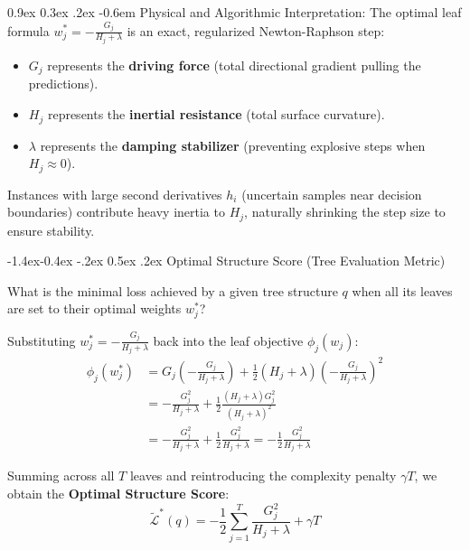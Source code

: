 \documentclass[11pt,a4paper]{article}
\makeatletter
\renewcommand\subsection{\@startsection{subsection}{2}{\z@}%
                                     {-1.4ex\@plus -0.4ex \@minus -.2ex}%
                                     {0.5ex \@plus .2ex}%
                                     {\normalfont\normalsize\bfseries}}
\renewcommand\paragraph{\@startsection{paragraph}{4}{\z@}%
                                     {0.9ex \@plus0.3ex \@minus.2ex}%
                                     {-0.6em}%
                                     {\normalfont\normalsize\bfseries}}
\makeatother
\begin{document}
\paragraph{Physical and Algorithmic Interpretation:}
The optimal leaf formula $w_j^* = -\frac{G_j}{H_j + \lambda}$ is an exact, regularized Newton-Raphson step:
\begin{itemize}
    \item $G_j$ represents the \textbf{driving force} (total directional gradient pulling the predictions).
    \item $H_j$ represents the \textbf{inertial resistance} (total surface curvature).
    \item $\lambda$ represents the \textbf{damping stabilizer} (preventing explosive steps when $H_j \approx 0$).
\end{itemize}
Instances with large second derivatives $h_i$ (uncertain samples near decision boundaries) contribute heavy inertia to $H_j$, naturally shrinking the step size to ensure stability.

\subsection{Optimal Structure Score (Tree Evaluation Metric)}

What is the minimal loss achieved by a given tree structure $q$ when all its leaves are set to their optimal weights $w_j^*$?

Substituting $w_j^* = -\frac{G_j}{H_j + \lambda}$ back into the leaf objective $\phi_j(w_j)$:
\begin{align}
    \phi_j(w_j^*) &= G_j \left( -\frac{G_j}{H_j + \lambda} \right) + \frac{1}{2}(H_j + \lambda) \left( -\frac{G_j}{H_j + \lambda} \right)^2 \nonumber \\
    &= -\frac{G_j^2}{H_j + \lambda} + \frac{1}{2} \frac{(H_j + \lambda) G_j^2}{(H_j + \lambda)^2} \nonumber \\
    &= -\frac{G_j^2}{H_j + \lambda} + \frac{1}{2} \frac{G_j^2}{H_j + \lambda} = -\frac{1}{2} \frac{G_j^2}{H_j + \lambda}
\end{align}

Summing across all $T$ leaves and reintroducing the complexity penalty $\gamma T$, we obtain the \textbf{Optimal Structure Score}:
\begin{equation}
    \tilde{\mathcal{L}}^*(q) = -\frac{1}{2} \sum_{j=1}^T \frac{G_j^2}{H_j + \lambda} + \gamma T
    \label{eq:optimal_structure_score}
\end{equation}
\end{document}
